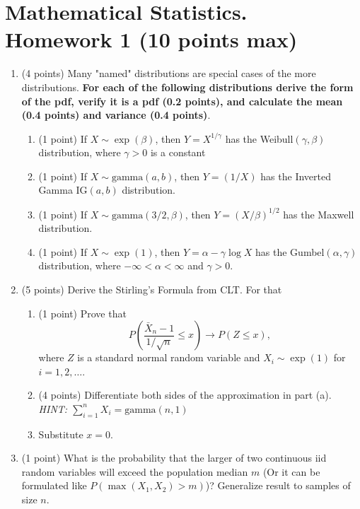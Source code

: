 \documentclass{article}
\begin{document}
\section*{Mathematical Statistics. Homework 1 (10 points max)}
\begin{enumerate}
    \item (4 points) Many "named" distributions are special cases of the more distributions. \textbf{For each of the following distributions derive the form of the pdf, verify it is a pdf (0.2 points), and calculate the mean (0.4 points) and variance (0.4 points)}.

    \begin{enumerate}
        \item (1 point) If $X \sim \exp(\beta)$, then $Y = X^{1 / \gamma}$ has the Weibull$(\gamma, \beta)$ distribution, where $\gamma > 0$ is a constant
        \item (1 point) If $X \sim \text{gamma}(a, b)$, then $Y = (1/X)$ has the Inverted Gamma IG$(a, b)$ distribution. 
        \item (1 point) If $X \sim \text{gamma}(3/2, \beta)$, then $Y = (X/\beta)^{1/2}$ has the Maxwell distribution.
        \item (1 point) If $X \sim \exp(1)$, then $Y = \alpha - \gamma \log X$ has the Gumbel$(\alpha, \gamma)$ distribution, where $-\infty <\alpha < \infty$ and $\gamma > 0$.
    \end{enumerate}
  \item (5 points) Derive the Stirling's Formula from CLT. For that 
  \begin{enumerate}
  \item (1 point) Prove that 
  \begin{equation*}
      P\left(\frac{\bar{X}_n - 1}{1 / \sqrt{n}} \leq x\right) \to P(Z \leq x),
  \end{equation*}
  where $Z$ is a standard normal random variable and $X_i \sim \exp(1)$ for $i = 1, 2,\dots$.
  \item (4 points) Differentiate both sides of the approximation in part (a). \textit{HINT: $\sum\limits_{i=1}^n X_i = \text{gamma}(n, 1)$}
  \item Substitute $x = 0$.
  \end{enumerate}
  
  \item (1 point) What is the probability that the larger of two continuous iid random variables will exceed the population median $m$ (Or it can be formulated like $P(\max(X_1, X_2) > m)$)? Generalize result to samples of size $n$.

\end{enumerate}
\end{document}
